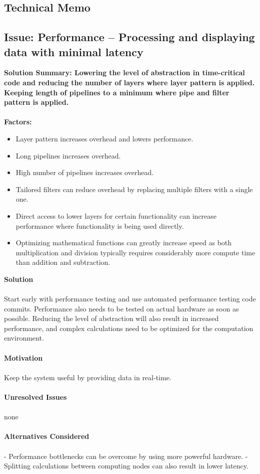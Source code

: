 \subsection*{Technical Memo}
\subsection{Issue: Performance -- Processing and displaying data with minimal latency
}
\textbf{Solution Summary: Lowering the level of abstraction in time-critical
code and reducing the number of layers where layer pattern is applied. Keeping
length of pipelines to a minimum where pipe and filter pattern is applied.\\
\\
Factors:}
\begin{itemize}
\item Layer pattern increases overhead and lowers performance.
\item Long pipelines increases overhead.
\item High number of pipelines increases overhead.
\item Tailored filters can reduce overhead by replacing multiple filters with a
single one.
\item Direct access to lower layers for certain functionality can increase
performance where functionality is being used directly.
\item Optimizing mathematical functions can greatly increase speed as both
multiplication and division typically requires considerably more compute time 
than addition and subtraction.
\end{itemize}
\textbf{Solution}\\
\\
Start early with performance testing and use automated performance testing code
commits. Performance also needs to be tested on actual hardware as soon as
possible. Reducing the level of abstraction will also result in increased
performance, and complex calculations need to be optimized for the computation
environment.\\
\\
\textbf{Motivation}\\
\\
Keep the system useful by providing data in real-time.\\
\\
\textbf{Unresolved Issues}\\
\\
none\\
\\
\textbf{Alternatives Considered}\\
\\
- Performance bottlenecks can be overcome by using more powerful hardware.
- Splitting calculations between computing nodes can also result in lower
latency. 
